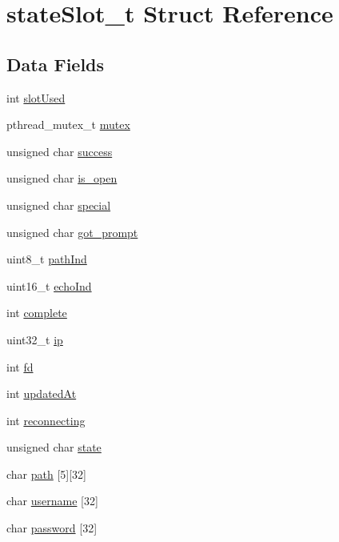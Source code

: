 \hypertarget{structstate_slot__t}{}\section{state\+Slot\+\_\+t Struct Reference}
\label{structstate_slot__t}
\subsection*{Data Fields}
\begin{DoxyCompactItemize}
\item 
int \hyperlink{structstate_slot__t_a3610d3548adf444e0e2ef1e0d877b651}{slot\+Used}
\item 
pthread\+\_\+mutex\+\_\+t \hyperlink{structstate_slot__t_a4acff8232e4aec9cd5c6dc200ac55ef3}{mutex}
\item 
unsigned char \hyperlink{structstate_slot__t_a520ac11e1908a743c9bf08ae832a9280}{success}
\item 
unsigned char \hyperlink{structstate_slot__t_adc1e9511c9cfe12e03d6145675caf75b}{is\+\_\+open}
\item 
unsigned char \hyperlink{structstate_slot__t_a6371714c4934187b2ed0fadea23c846d}{special}
\item 
unsigned char \hyperlink{structstate_slot__t_a30b88cb38c48a1b8ea676f58ec9ca224}{got\+\_\+prompt}
\item 
uint8\+\_\+t \hyperlink{structstate_slot__t_a545d93951b682c93f99d3cefc1026780}{path\+Ind}
\item 
uint16\+\_\+t \hyperlink{structstate_slot__t_a4551e8f3f7a24f8ef0b830e4b8ef8e96}{echo\+Ind}
\item 
int \hyperlink{structstate_slot__t_a520408f4775914f7510cc59db5a60b38}{complete}
\item 
uint32\+\_\+t \hyperlink{structstate_slot__t_a69ddb9c845da426f636d9dd0dbed4e7e}{ip}
\item 
int \hyperlink{structstate_slot__t_a6f8059414f0228f0256115e024eeed4b}{fd}
\item 
int \hyperlink{structstate_slot__t_a019e1e0b8ff724d1efe0a7440c26fd4e}{updated\+At}
\item 
int \hyperlink{structstate_slot__t_a6c8d3290d532f7d318073701051f8c39}{reconnecting}
\item 
unsigned char \hyperlink{structstate_slot__t_ab12828525693568ae9c217805bea1ef9}{state}
\item 
char \hyperlink{structstate_slot__t_aae270593a607896248d352ee9d7caa2b}{path} \mbox{[}5\mbox{]}\mbox{[}32\mbox{]}
\item 
char \hyperlink{structstate_slot__t_a3a2730751a4fbaa66b4ab1fb3fb7fcba}{username} \mbox{[}32\mbox{]}
\item 
char \hyperlink{structstate_slot__t_a2bfda7e5c73ce534de13604eb4a02565}{password} \mbox{[}32\mbox{]}
\end{DoxyCompactItemize}


